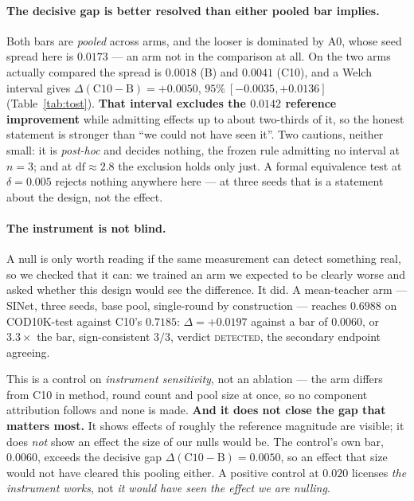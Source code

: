 \documentclass{article} %
\begin{document}
\paragraph{The decisive gap is better resolved than either pooled bar implies.} Both bars are
\emph{pooled} across arms, and the looser is dominated by A0, whose seed spread here is $0.0173$ ---
an arm not in the comparison at all. On the two arms actually compared the spread is $0.0018$ (B)
and $0.0041$ (C10), and a Welch interval gives $\Delta(\mathrm{C10}-\mathrm{B}) = +0.0050$,
$95\%\ [-0.0035, +0.0136]$ (Table~\ref{tab:tost}). \textbf{That interval excludes the $0.0142$
reference improvement} while admitting effects up to about two-thirds of it, so the honest statement
is stronger than ``we could not have seen it''. Two cautions, neither small: it is \emph{post-hoc}
and decides nothing, the frozen rule admitting no interval at $n=3$; and at $\mathrm{df} \approx 2.8$
the exclusion holds only just. A formal equivalence test at $\delta = 0.005$ rejects nothing
anywhere here --- at three seeds that is a statement about the design, not the effect.

\paragraph{The instrument is not blind.} A null is only worth reading if the same measurement can
detect something real, so we checked that it can: we trained an arm we expected to be clearly worse
and asked whether this design would see the difference. It did. A mean-teacher arm --- SINet, three
seeds, base pool, single-round by construction --- reaches $0.6988$ on COD10K-test against C10's
$0.7185$: $\Delta = +0.0197$ against a bar of $0.0060$, or $3.3\times$ the bar, sign-consistent $3/3$,
verdict \textsc{detected}, the secondary endpoint agreeing.

This is a control on \emph{instrument sensitivity}, not an ablation --- the arm differs from C10 in
method, round count and pool size at once, so no component attribution follows and none is made.
\textbf{And it does not close the gap that matters most.} It shows effects of roughly the reference
magnitude are visible; it does \emph{not} show an effect the size of our nulls would be. The
control's own bar, $0.0060$, exceeds the decisive gap $\Delta(\mathrm{C10}-\mathrm{B}) = 0.0050$, so
an effect that size would not have cleared this pooling either. A positive control at $0.020$
licenses \emph{the instrument works}, not \emph{it would have seen the effect we are nulling}.
\end{document}
